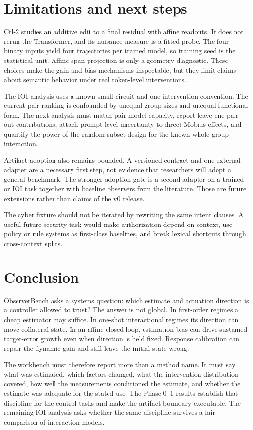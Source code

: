 \section{Limitations and next steps}

Ctl-2 studies an additive edit to a final residual with affine readouts. It does
not rerun the Transformer, and its nuisance measure is a fitted probe. The four
binary inputs yield four trajectories per trained model, so training seed is
the statistical unit. Affine-span projection is only a geometry diagnostic.
These choices make the gain and bias mechanisms inspectable, but they limit
claims about semantic behavior under real token-level interventions.

The IOI analysis uses a known small circuit and one intervention convention.
The current pair ranking is confounded by unequal group sizes and unequal
functional form. The next analysis must match pair-model capacity, report
leave-one-pair-out contributions, attach prompt-level uncertainty to direct
M\"obius effects, and quantify the power of the random-subset design for the
known whole-group interaction.

Artifact adoption also remains bounded. A versioned contract and one external
adapter are a necessary first step, not evidence that researchers will adopt a
general benchmark. The stronger adoption gate is a second adapter on a trained
or IOI task together with baseline observers from the literature. Those are
future extensions rather than claims of the v0 release.

The cyber fixture should not be iterated by rewriting the same intent clauses.
A useful future security task would make authorization depend on context, use
policy or rule systems as first-class baselines, and break lexical shortcuts
through cross-context splits.

\section{Conclusion}

ObserverBench asks a systems question: which estimate and actuation direction
is a controller allowed to trust? The answer is not global. In first-order
regimes a cheap estimator may suffice. In one-shot interactional regimes its
direction can move collateral state. In an affine closed loop, estimation bias
can drive sustained target-error growth even when direction is held fixed.
Response calibration can repair the dynamic gain and still leave the initial
state wrong.

The workbench must therefore report more than a method name. It must say what
was estimated, which factors changed, what the intervention distribution
covered, how well the measurements conditioned the estimate, and whether the
estimate was adequate for the stated use. The Phase 0--1 results establish that
discipline for the control tasks and make the artifact boundary executable. The
remaining IOI analysis asks whether the same discipline survives a fair
comparison of interaction models.
